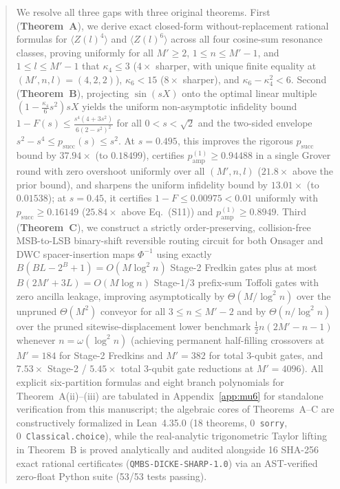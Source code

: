 \documentclass[11pt,a4paper]{article}
\theoremstyle{remark}
\begin{document}
\begin{abstract}
We resolve all three gaps with three original theorems. First (\textbf{Theorem~A}), we derive exact closed-form without-replacement rational formulas for $\langle Z(l)^4 \rangle$ and $\langle Z(l)^6 \rangle$ across all four cosine-sum resonance classes, proving uniformly for all $M' \ge 2$, $1 \le n \le M'-1$, and $1 \le l \le M'-1$ that $\kappa_4 \le 3$ ($4\times$ sharper, with unique finite equality at $(M', n, l) = (4, 2, 2)$), $\kappa_6 < 15$ ($8\times$ sharper), and $\kappa_6 - \kappa_4^2 < 6$. Second (\textbf{Theorem~B}), projecting $\sin(sX)$ onto the optimal linear multiple $(1 - \frac{\kappa_4}{6} s^2) sX$ yields the uniform non-asymptotic infidelity bound $1 - F(s) \le \frac{s^4(4 + 3s^2)}{6(2 - s^2)^2}$ for all $0 < s < \sqrt{2}$ and the two-sided envelope $s^2 - s^4 \le p_{\mathrm{succ}}(s) \le s^2$. At $s = 0.495$, this improves the rigorous $p_{\mathrm{succ}}$ bound by $37.94\times$ (to $0.18499$), certifies $p_{\mathrm{amp}}^{(1)} \ge 0.94488$ in a single Grover round with zero overshoot uniformly over all $(M', n, l)$ ($21.8\times$ above the prior bound), and sharpens the uniform infidelity bound by $13.01\times$ (to $0.01538$); at $s = 0.45$, it certifies $1 - F \le 0.00975 < 0.01$ uniformly with $p_{\mathrm{succ}} \ge 0.16149$ ($25.84\times$ above Eq.~(S11)) and $p_{\mathrm{amp}}^{(1)} \ge 0.8949$. Third (\textbf{Theorem~C}), we construct a strictly order-preserving, collision-free MSB-to-LSB binary-shift reversible routing circuit for both Onsager and DWC spacer-insertion maps $\Phi^{-1}$ using exactly $B(BL - 2^B + 1) = O(M \log^2 n)$ Stage-2 Fredkin gates plus at most $B(2M' + 3L) = O(M \log n)$ Stage-1/3 prefix-sum Toffoli gates with zero ancilla leakage, improving asymptotically by $\Theta(M/\log^2 n)$ over the unpruned $\Theta(M^2)$ conveyor for all $3 \le n \le M'-2$ and by $\Theta(n/\log^2 n)$ over the pruned sitewise-displacement lower benchmark $\frac{1}{2}n(2M'-n-1)$ whenever $n = \omega(\log^2 n)$ (achieving permanent half-filling crossovers at $M' = 184$ for Stage-2 Fredkins and $M' = 382$ for total 3-qubit gates, and $7.53\times$ Stage-2 / $5.45\times$ total 3-qubit gate reductions at $M' = 4096$). All explicit six-partition formulas and eight branch polynomials for Theorem~A(ii)--(iii) are tabulated in Appendix~\ref{app:mu6} for standalone verification from this manuscript; the algebraic cores of Theorems~A--C are constructively formalized in Lean~4.35.0 (18 theorems, 0~\texttt{sorry}, 0~\texttt{Classical.choice}), while the real-analytic trigonometric Taylor lifting in Theorem~B is proved analytically and audited alongside 16 SHA-256 exact rational certificates (\texttt{QMBS-DICKE-SHARP-1.0}) via an AST-verified zero-float Python suite (53/53 tests passing).
\end{abstract}
\end{document}

